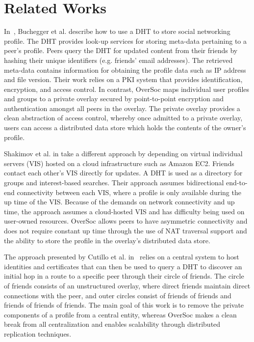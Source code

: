 \section{Related Works}
\label{vpo:background}

In~\cite{peerson}, Buchegger et al. describe how to use a DHT to store social
networking profile.  The DHT provides look-up services for storing meta-data
pertaining to a peer's profile.  Peers query the DHT for updated content from
their friends by hashing their unique identifiers (e.g. friends' email
addresses).  The retrieved meta-data contains information for obtaining the
profile data such as IP address and file version. Their work relies on a PKI
system that provides identification, encryption, and access control.  In
contrast, OverSoc maps individual user profiles and groups to a private overlay
secured by point-to-point encryption and authentication amongst all peers in
the overlay.  The private overlay provides a clean abstraction of access
control, whereby once admitted to a private overlay, users can access a
distributed data store which holds the contents of the owner's profile.

Shakimov et al. in \cite{vis-a-vis} take a different approach by depending on
virtual individual servers (VIS) hosted on a cloud infrastructure such as
Amazon EC2. Friends contact each other's VIS directly for updates.  A DHT is
used as a directory for groups and interest-based searches. Their approach
assumes bidirectional end-to-end connectivity between each VIS, where a profile
is only available during the up time of the VIS.  Because of the demands on
network connectivity and up time, the approach assumes a cloud-hosted VIS and
has difficulty being used on user-owned resources.  OverSoc allows peers to
have  asymmetric connectivity and does not require constant up time through the
use of NAT traversal support and the ability to store the profile in the
overlay's distributed data store.

The approach presented by Cutillo et al. in~\cite{matryoshka} relies on a
central system to host identities and certificates that can then be used to
query a DHT to discover an initial hop in a route to a specific peer through
their circle of friends.  The circle of friends consists of an unstructured
overlay, where direct friends maintain direct connections with the peer, and
outer circles consist of friends of friends and friends of friends of friends.
The main goal of this work is to remove the private components of a profile
from a central entity, whereas OverSoc makes a clean break from all
centralization and enables scalability through distributed replication
techniques.

